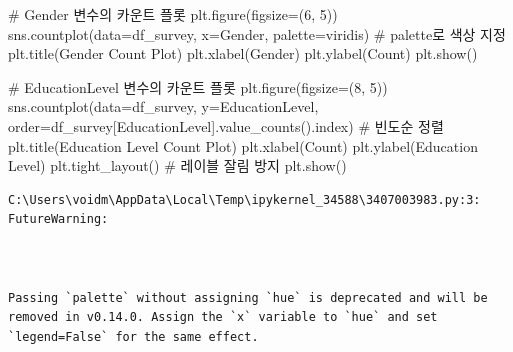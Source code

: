 \documentclass[
  letterpaper,
]{book}
\newenvironment{Shaded}{\begin{snugshade}}{\end{snugshade}}
\newcommand{\CommentTok}[1]{\textcolor[rgb]{0.37,0.37,0.37}{#1}}
\newcommand{\DecValTok}[1]{\textcolor[rgb]{0.68,0.00,0.00}{#1}}
\newcommand{\NormalTok}[1]{\textcolor[rgb]{0.00,0.23,0.31}{#1}}
\newcommand{\OperatorTok}[1]{\textcolor[rgb]{0.37,0.37,0.37}{#1}}
\newcommand{\StringTok}[1]{\textcolor[rgb]{0.13,0.47,0.30}{#1}}
\begin{document}
\begin{Shaded}
\begin{Highlighting}[]
\CommentTok{\# Gender 변수의 카운트 플롯}
\NormalTok{plt.figure(figsize}\OperatorTok{=}\NormalTok{(}\DecValTok{6}\NormalTok{, }\DecValTok{5}\NormalTok{))}
\NormalTok{sns.countplot(data}\OperatorTok{=}\NormalTok{df\_survey, x}\OperatorTok{=}\StringTok{\textquotesingle{}Gender\textquotesingle{}}\NormalTok{, palette}\OperatorTok{=}\StringTok{\textquotesingle{}viridis\textquotesingle{}}\NormalTok{) }\CommentTok{\# palette로 색상 지정}
\NormalTok{plt.title(}\StringTok{\textquotesingle{}Gender Count Plot\textquotesingle{}}\NormalTok{)}
\NormalTok{plt.xlabel(}\StringTok{\textquotesingle{}Gender\textquotesingle{}}\NormalTok{)}
\NormalTok{plt.ylabel(}\StringTok{\textquotesingle{}Count\textquotesingle{}}\NormalTok{)}
\NormalTok{plt.show()}

\CommentTok{\# EducationLevel 변수의 카운트 플롯}
\NormalTok{plt.figure(figsize}\OperatorTok{=}\NormalTok{(}\DecValTok{8}\NormalTok{, }\DecValTok{5}\NormalTok{))}
\NormalTok{sns.countplot(data}\OperatorTok{=}\NormalTok{df\_survey, y}\OperatorTok{=}\StringTok{\textquotesingle{}EducationLevel\textquotesingle{}}\NormalTok{, order}\OperatorTok{=}\NormalTok{df\_survey[}\StringTok{\textquotesingle{}EducationLevel\textquotesingle{}}\NormalTok{].value\_counts().index) }\CommentTok{\# 빈도순 정렬}
\NormalTok{plt.title(}\StringTok{\textquotesingle{}Education Level Count Plot\textquotesingle{}}\NormalTok{)}
\NormalTok{plt.xlabel(}\StringTok{\textquotesingle{}Count\textquotesingle{}}\NormalTok{)}
\NormalTok{plt.ylabel(}\StringTok{\textquotesingle{}Education Level\textquotesingle{}}\NormalTok{)}
\NormalTok{plt.tight\_layout() }\CommentTok{\# 레이블 잘림 방지}
\NormalTok{plt.show()}
\end{Highlighting}
\end{Shaded}

\begin{verbatim}
C:\Users\voidm\AppData\Local\Temp\ipykernel_34588\3407003983.py:3: FutureWarning:



Passing `palette` without assigning `hue` is deprecated and will be removed in v0.14.0. Assign the `x` variable to `hue` and set `legend=False` for the same effect.

\end{verbatim}
\end{document}
